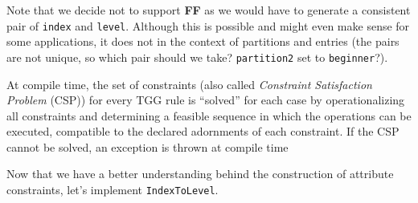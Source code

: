 Note that we decide not to support \textbf{FF} as we would have to generate a consistent pair of \texttt{index} and \texttt{level}. Although this is possible
and might even make sense for some applications, it does not in the context of partitions and entries (the pairs are not unique, so which pair should we take?
\texttt{partition2} set to \texttt{beginner}?).

At compile time, the set of constraints (also called \emph{Constraint Satisfaction Problem} (CSP)) for every TGG rule is ``solved'' for each case by
operationalizing all constraints and determining a feasible sequence in which the operations can be executed, compatible to the declared adornments of each
constraint. If the CSP cannot be solved, an exception is thrown at compile time

Now that we have a better understanding behind the construction of attribute constraints, let's implement \texttt{IndexToLevel}.

